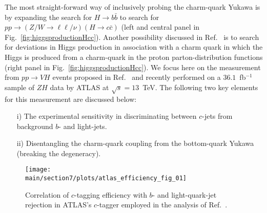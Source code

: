 \documentclass[../report.tex]{subfiles}
\providecommand{\main}{..}
\begin{document}
The most straight-forward way of inclusively probing the charm-quark Yukawa is by 
expanding the search for $H\to b\bar b$ to search for 
$pp \to (Z/W\to\ell\ell/\nu) (H\to c\bar c)$ \cite{Perez:2015aoa}
(left and central panel in Fig.~\ref{fig:higgsproductionHcc}).
Another possibility discussed in Ref.~\cite{Brivio:2015fxa} is to search for deviations in Higgs production 
in association with a charm quark in which the Higgs is produced from a charm-quark in the proton 
parton-distribution functions (right panel in Fig.~\ref{fig:higgsproductionHcc}).
We focus here on the measurement from $pp\to VH$ events proposed in Ref.~\cite{Perez:2015aoa}
and recently performed on a $36.1$~fb$^{-1}$ sample of $ZH$ data by ATLAS \cite{Aaboud:2018fhh}
at $\sqrt{s}=13$~TeV.
The following two key elements for this measurement are discussed below:
\begin{itemize}
	\item[i)] The experimental sensitivity in discriminating between $c$-jets from
		background $b$- and light-jets.
	\item[ii)] Disentangling the charm-quark coupling from the 
		bottom-quark Yukawa (breaking the degeneracy).
\end{itemize}

\begin{figure}[h]
	\centering
	\texttt{[image: \\main/section7/plots/atlas\_efficiency\_fig\_01]}
	\caption{Correlation of $c$-tagging efficiency with $b$- and light-quark-jet rejection
	in ATLAS's $c$-tagger employed in the analysis of Ref.~\cite{Aaboud:2018fhh}.
\label{fig:ATLASctagefficiency}}
\end{figure}
\end{document}

